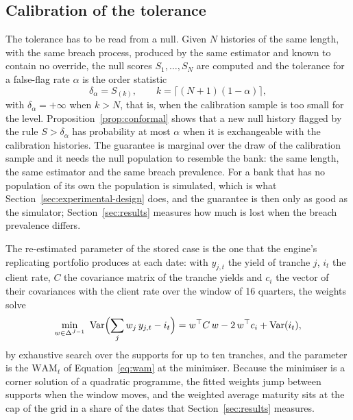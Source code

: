 \subsection{Calibration of the tolerance}
\label{sec:method-calibration}

The tolerance has to be read from a null. Given $N$ histories of the same length, with the same breach process, produced by the same estimator and known to contain no override, the null scores $S_1,\dots,S_N$ are computed and the tolerance for a false-flag rate $\alpha$ is the order statistic
\begin{equation}
\delta_\alpha=S_{(k)},\qquad k=\lceil (N+1)(1-\alpha)\rceil,
\label{eq:calibration}
\end{equation}
with $\delta_\alpha=+\infty$ when $k>N$, that is, when the calibration sample is too small for the level. Proposition~\ref{prop:conformal} shows that a new null history flagged by the rule $S>\delta_\alpha$ has probability at most $\alpha$ when it is exchangeable with the calibration histories. The guarantee is marginal over the draw of the calibration sample and it needs the null population to resemble the bank: the same length, the same estimator and the same breach prevalence. For a bank that has no population of its own the population is simulated, which is what Section~\ref{sec:experimental-design} does, and the guarantee is then only as good as the simulator; Section~\ref{sec:results} measures how much is lost when the breach prevalence differs.

The re-estimated parameter of the stored case is the one that the engine's replicating portfolio produces at each date: with $y_{j,t}$ the yield of tranche $j$, $i_t$ the client rate, $C$ the covariance matrix of the tranche yields and $c_i$ the vector of their covariances with the client rate over the window of 16 quarters, the weights solve
\begin{equation}
\min_{w\in\Delta^{J-1}}\ \operatorname{Var}\Bigl(\sum_{j}w_j\,y_{j,t}-i_t\Bigr)=w^{\top}C\,w-2\,w^{\top}c_i+\operatorname{Var}(i_t),
\label{eq:replicating}
\end{equation}
by exhaustive search over the supports for up to ten tranches, and the parameter is the $\mathrm{WAM}_t$ of Equation~\eqref{eq:wam} at the minimiser. Because the minimiser is a corner solution of a quadratic programme, the fitted weights jump between supports when the window moves, and the weighted average maturity sits at the cap of the grid in a share of the dates that Section~\ref{sec:results} measures.

